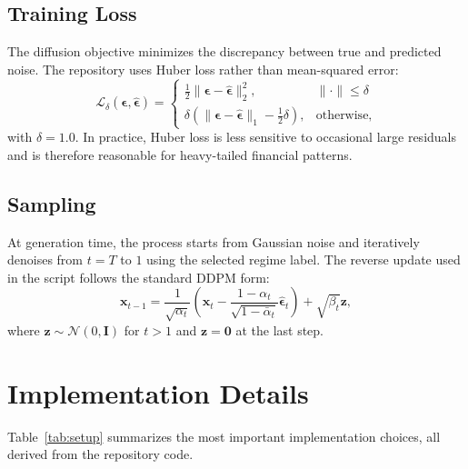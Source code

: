 \documentclass[conference]{IEEEtran}
\begin{document}
\subsection{Training Loss}
The diffusion objective minimizes the discrepancy between true and predicted noise. The repository uses Huber loss rather than mean-squared error:
\begin{equation}
\mathcal{L}_{\delta}(\boldsymbol{\epsilon}, \hat{\boldsymbol{\epsilon}}) =
\begin{cases}
\frac{1}{2}\|\boldsymbol{\epsilon} - \hat{\boldsymbol{\epsilon}}\|_2^2, & \|\cdot\| \leq \delta\\
\delta\left(\|\boldsymbol{\epsilon} - \hat{\boldsymbol{\epsilon}}\|_1 - \frac{1}{2}\delta\right), & \text{otherwise},
\end{cases}
\end{equation}
with $\delta = 1.0$. In practice, Huber loss is less sensitive to occasional large residuals and is therefore reasonable for heavy-tailed financial patterns.

\subsection{Sampling}
At generation time, the process starts from Gaussian noise and iteratively denoises from $t=T$ to $1$ using the selected regime label. The reverse update used in the script follows the standard DDPM form:
\begin{equation}
\mathbf{x}_{t-1} = \frac{1}{\sqrt{\alpha_t}}\left(\mathbf{x}_t - \frac{1-\alpha_t}{\sqrt{1-\bar{\alpha}_t}}\hat{\boldsymbol{\epsilon}}_t\right) + \sqrt{\beta_t}\mathbf{z},
\end{equation}
where $\mathbf{z}\sim\mathcal{N}(0,\mathbf{I})$ for $t>1$ and $\mathbf{z}=\mathbf{0}$ at the last step.

\section{Implementation Details}
Table~\ref{tab:setup} summarizes the most important implementation choices, all derived from the repository code.
\end{document}
